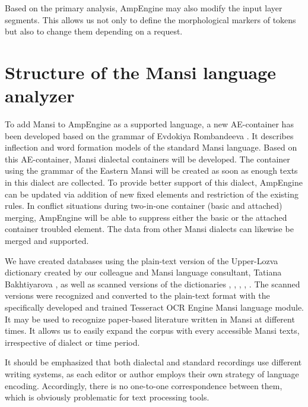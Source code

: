 \documentclass[b5paper,notitlepage]{article}
\begin{document}
Based on the primary analysis, AmpEngine may also modify the input layer segments. This allows us not only to define the morphological markers of tokens but also to change them depending on a request.


\section{Structure of the Mansi language analyzer}

To add Mansi to AmpEngine as a supported language, a new AE-container has been developed  based on the grammar of Evdokiya Rombandeeva \cite{Rombandeeva vogul}. It describes inflection and word formation models of the standard Mansi language. Based on this  AE-container, Mansi dialectal containers will be developed. The container using the grammar of the Eastern Mansi \cite{Kulonen} will be created as soon as enough texts in this dialect are collected.
To provide better support of this dialect, AmpEngine can be updated via addition of new fixed elements and restriction of the existing rules. In conflict situations during two-in-one container (basic and attached) merging, AmpEngine will be able to suppress either the basic or the attached container troubled element. The data from other Mansi dialects can likewise be merged and supported.

We have created databases using the plain-text version of the Upper-Lozva dictionary created by our colleague and Mansi language consultant, Tatiana Bakhtiyarova \cite{tanya}, as well as scanned versions of the dictionaries \cite{chernetsov}, \cite{balandin}, \cite{Rombandeeva-Kuzakova}, \cite{Munkacsi} \cite{Rombandeeva}, \cite{Kannisto}. The scanned versions were recognized and converted to the plain-text format with the specifically developed and trained Tesseract OCR Engine Mansi language module. It may be used to recognize paper-based literature written in Mansi at different times. It allows us to easily expand the corpus with every accessible Mansi texts, irrespective of dialect or time period. 

It should be emphasized that both dialectal and standard recordings use different writing systems, as each editor or author employs their own strategy of language encoding. Accordingly, there is no one-to-one correspondence between them, which is obviously problematic for text processing tools. 
\end{document}

